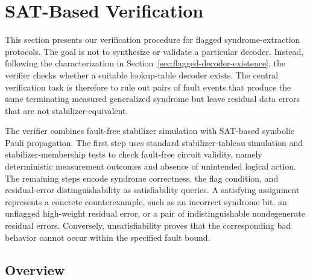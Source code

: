 \documentclass[acmsmall,screen,review,anonymous,nonacm]{acmart}
\begin{document}
\section{SAT-Based Verification}
\label{sec:sat-verification}


This section presents our verification procedure for flagged syndrome-extraction protocols. The goal is not to synthesize or validate a particular decoder. Instead, following the characterization in Section~\ref{sec:flagged-decoder-existence}, the verifier checks whether a suitable lookup-table decoder exists. The central verification task is therefore to rule out pairs of fault events that produce the same terminating measured generalized syndrome but leave residual data errors that are not stabilizer-equivalent.

The verifier combines fault-free stabilizer simulation with SAT-based symbolic Pauli propagation. The first step uses standard stabilizer-tableau simulation and stabilizer-membership tests to check fault-free circuit validity, namely deterministic measurement outcomes and absence of unintended logical action. The remaining steps encode syndrome correctness, the flag condition, and residual-error distinguishability as satisfiability queries. A satisfying assignment represents a concrete counterexample, such as an incorrect syndrome bit, an unflagged high-weight residual error, or a pair of indistinguishable nondegenerate residual errors. Conversely, unsatisfiability proves that the corresponding bad behavior cannot occur within the specified fault bound.

\subsection{Overview}
\label{subsec:sat-overview}
\end{document}

